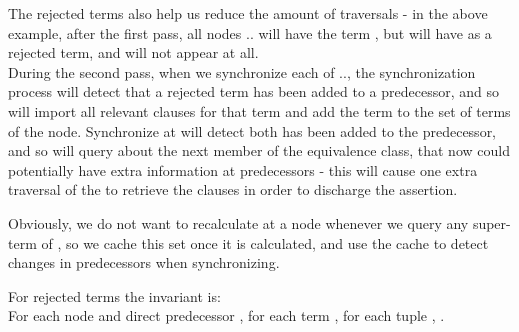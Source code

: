 The rejected terms also help us reduce the amount of \cfg traversals - in the above example, after the first pass, 
all nodes .. will have the term , but will have  as a rejected term, 
and  will not appear at all.\\
During the second pass, when we synchronize each of .., the synchronization process will detect that a rejected term  has been added to a predecessor, and so will import all relevant clauses for that term and add the term to the set of terms of the node.
Synchronize at  will detect both  has been added to the predecessor, and so will query about the next member of the equivalence class,  that now could potentially have extra information at predecessors - this will cause one extra traversal of the \cfg to retrieve the clauses  in order to discharge the assertion.

Obviously, we do not want to recalculate  at a node  whenever we query any super-term of , so we cache this set once it is calculated, and use the cache to detect changes in predecessors when synchronizing.

For rejected terms the invariant is:\\
For each node  and direct predecessor , 
for each term , 
for each tuple , 
.

